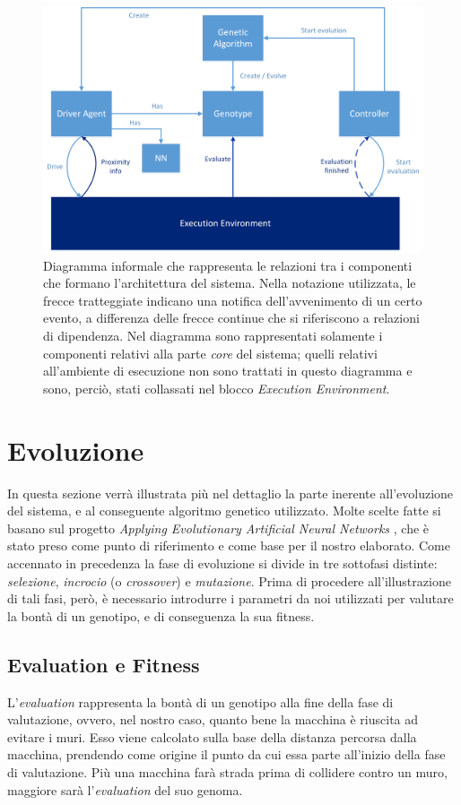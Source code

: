 \documentclass[a4paper,12pt]{article}
\begin{document}
\begin{figure}[H]
	\centering
	\includegraphics[width=130mm]{./img/architecture.png}
	\caption{Diagramma informale che rappresenta le relazioni tra i componenti che formano l'architettura del sistema. Nella notazione utilizzata, le frecce tratteggiate indicano una notifica dell'avvenimento di un certo evento, a differenza delle frecce continue che si riferiscono a relazioni di dipendenza. Nel diagramma sono rappresentati solamente i componenti relativi alla parte \emph{core} del sistema; quelli relativi all'ambiente di esecuzione non sono trattati in questo diagramma e sono, perciò, stati collassati nel blocco \emph{Execution Environment}.  \label{architecture-diagram}}
\end{figure}

\section{Evoluzione} \label{evolution}
In questa sezione verrà illustrata più nel dettaglio la parte inerente all'evoluzione del sistema, e al conseguente algoritmo genetico utilizzato. Molte scelte fatte si basano sul progetto \emph{Applying Evolutionary Artificial Neural Networks} \cite{arztRepo}, che è stato preso come punto di riferimento e come base per il nostro elaborato. Come accennato in precedenza la fase di evoluzione si divide in tre sottofasi distinte: \emph{selezione}, \emph{incrocio} (o \emph{crossover}) e \emph{mutazione}. Prima di procedere all'illustrazione di tali fasi, però, è necessario introdurre i parametri da noi utilizzati per valutare la bontà di un genotipo, e di conseguenza la sua fitness.
\subsection{Evaluation e Fitness}
L'\emph{evaluation} rappresenta la bontà di un genotipo alla fine della fase di valutazione, ovvero, nel nostro caso, quanto bene la macchina è riuscita ad evitare i muri. Esso viene calcolato sulla base della distanza percorsa dalla macchina, prendendo come origine il punto da cui essa parte all'inizio della fase di valutazione. Più una macchina farà strada prima di collidere contro un muro, maggiore sarà l'\emph{evaluation} del suo genoma. 
\end{document}
